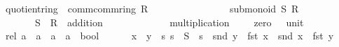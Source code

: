 \documentclass[12pt]{scrartcl}
\begin{document}
\begin{isabelle}
\isamarkupfalse%
\ quotient{\isacharunderscore}{\kern0pt}ring\ {\isacharequal}{\kern0pt}\ comm{\isacharcolon}{\kern0pt}comm{\isacharunderscore}{\kern0pt}ring\ R\ {\isachardoublequoteopen}{\isacharparenleft}{\kern0pt}{\isacharplus}{\kern0pt}{\isacharparenright}{\kern0pt}{\isachardoublequoteclose}\ {\isachardoublequoteopen}{\isacharparenleft}{\kern0pt}{\isasymcdot}{\isacharparenright}{\kern0pt}{\isachardoublequoteclose}\ {\isachardoublequoteopen}{\isasymzero}{\isachardoublequoteclose}\ {\isachardoublequoteopen}{\isasymone}{\isachardoublequoteclose}\ \isanewline
\ \ \ \ \ \ \ \ \ \ {\isacharplus}{\kern0pt}\ submonoid\ S\ R\ {\isachardoublequoteopen}{\isacharparenleft}{\kern0pt}{\isasymcdot}{\isacharparenright}{\kern0pt}{\isachardoublequoteclose}\ {\isachardoublequoteopen}{\isasymone}{\isachardoublequoteclose}\isanewline
\ \ \ \ \ \ \ S\ \ R\ \ addition\ {\isacharparenleft}{\kern0pt}\ {\isachardoublequoteopen}{\isacharplus}{\kern0pt}{\isachardoublequoteclose}\ {}{}{\isacharparenright}{\kern0pt}\ \isanewline
\ \ \ \ \ \ \ \ \ multiplication\ {\isacharparenleft}{\kern0pt}\ {\isachardoublequoteopen}{\isasymcdot}{\isachardoublequoteclose}\ {}{}{\isacharparenright}{\kern0pt}\ \ zero\ {\isacharparenleft}{\kern0pt}{\isachardoublequoteopen}{\isasymzero}{\isachardoublequoteclose}{\isacharparenright}{\kern0pt}\ \ unit\ {\isacharparenleft}{\kern0pt}{\isachardoublequoteopen}{\isasymone}{\isachardoublequoteclose}{\isacharparenright}{\kern0pt}\isanewline
{}\isanewline
\isanewline
{}\isamarkupfalse%
\ rel{\isacharcolon}{\kern0pt}{\isacharcolon}{\kern0pt}\ {\isachardoublequoteopen}{\isacharparenleft}{\kern0pt}{\isacharprime}{\kern0pt}a\ {\isasymtimes}\ {\isacharprime}{\kern0pt}a{\isacharparenright}{\kern0pt}\ {\isasymRightarrow}\ {\isacharparenleft}{\kern0pt}{\isacharprime}{\kern0pt}a\ {\isasymtimes}\ {\isacharprime}{\kern0pt}a{\isacharparenright}{\kern0pt}\ {\isasymRightarrow}\ bool{\isachardoublequoteclose}\ {\isacharparenleft}{\kern0pt}\ {\isachardoublequoteopen}{\isasymsim}{\isachardoublequoteclose}\ {}{}{\isacharparenright}{\kern0pt}\isanewline
\ \ \ {\isachardoublequoteopen}x\ {\isasymsim}\ y\ {\isasymequiv}\ {\isasymexists}s{}{\isachardot}{\kern0pt}\ s{}\ {\isasymin}\ S\ {\isasymand}\ s{}\ {\isasymcdot}\ {\isacharparenleft}{\kern0pt}snd\ y\ {\isasymcdot}\ fst\ x\ {\isacharminus}{\kern0pt}\ snd\ x\ {\isasymcdot}\ fst\ y{\isacharparenright}{\kern0pt}\ {\isacharequal}{\kern0pt}\ {\isasymzero}{\isachardoublequoteclose}\isanewline

\end{isabelle}
\end{document}
